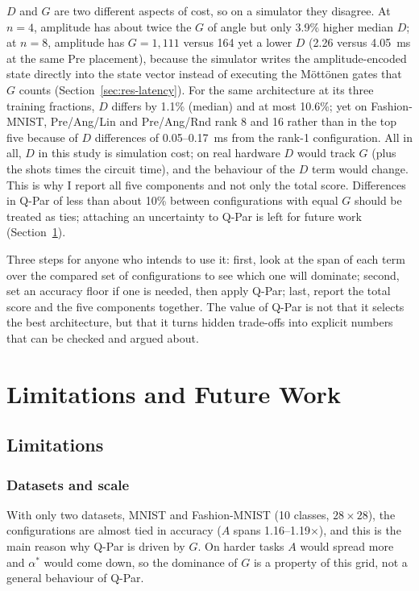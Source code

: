 \documentclass{ieeeaccess}
\begin{document}
$D$ and $G$ are two different aspects of cost, so on a simulator they disagree. At $n = 4$, amplitude has about twice the $G$ of angle but only 3.9\% higher median $D$; at $n = 8$, amplitude has $G = 1{,}111$ versus 164 yet a lower $D$ (2.26 versus 4.05~ms at the same Pre placement), because the simulator writes the amplitude-encoded state directly into the state vector instead of executing the M\"ott\"onen gates that $G$ counts (Section~\ref{sec:res-latency}). For the same architecture at its three training fractions, $D$ differs by 1.1\% (median) and at most 10.6\%; yet on Fashion-MNIST, Pre/Ang/Lin and Pre/Ang/Rnd rank 8 and 16 rather than in the top five because of $D$ differences of 0.05--0.17~ms from the rank-1 configuration. All in all, $D$ in this study is simulation cost; on real hardware $D$ would track $G$ (plus the shots times the circuit time), and the behaviour of the $D$ term would change. This is why I report all five components and not only the total score. Differences in Q-Par of less than about 10\% between configurations with equal $G$ should be treated as ties; attaching an uncertainty to Q-Par is left for future work (Section~\ref{sec:limitations}).

Three steps for anyone who intends to use it: first, look at the span of each term over the compared set of configurations to see which one will dominate; second, set an accuracy floor if one is needed, then apply Q-Par; last, report the total score and the five components together. The value of Q-Par is not that it selects the best architecture, but that it turns hidden trade-offs into explicit numbers that can be checked and argued about.

\section{Limitations and Future Work}
\label{sec:limitations}

\subsection{Limitations}
\label{sec:lim}

\subsubsection{Datasets and scale}
\label{sec:lim-data}

With only two datasets, MNIST and Fashion-MNIST (10 classes, $28\times28$), the configurations are almost tied in accuracy ($A$ spans 1.16--1.19$\times$), and this is the main reason why Q-Par is driven by $G$. On harder tasks $A$ would spread more and $\alpha^*$ would come down, so the dominance of $G$ is a property of this grid, not a general behaviour of Q-Par.
\end{document}
